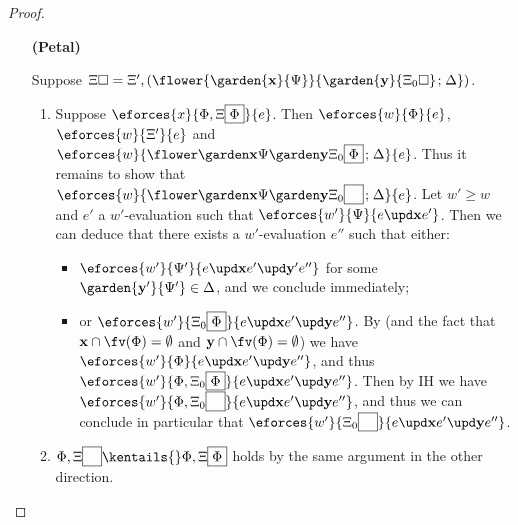 \begin{scope}
\begin{proof}
\begin{itemize}
\begin{itemize}
        \item[\textbf{(Petal)}]
          \renewcommand{\FillXi}[1]{\Xi', (\flower{\garden{\bx}{\Psi}}{\garden{\by}{#1}
          \sep \Delta})}
          \renewcommand{\rFillXi}[1]{\flower{\garden{\bx}{\Psi}}{\garden{\by}{#1}
          \sep \Delta}}

          Suppose $\Xi\hole = \FillXi{\Xi_0\hole}$.
          \begin{enumerate}
            \item Suppose $\eforces{x}{\Phi, \ffillXi{\Phi}}{e}$. Then
            $\eforces{w}{\Phi}{e}$, $\eforces{w}{\Xi'}{e}$ and
            $\eforces{w}{\rfillXi{\Phi}}{e}$. Thus it remains to show that
            $\eforces{w}{\rfillXi{\phantom{\Phi}}}{e}$. Let $w' \geq w$ and $e'$
            a $w'$-evaluation such that
            $\eforces{w'}{\Psi}{\update{e}{\bx}{e'}}$. Then we can deduce
            that there exists a $w'$-evaluation $e''$ such that either:
            \begin{itemize}
              \item
              $\eforces{w'}{\Psi'}{\update{e}{\bx}{\update{e'}{\mathbf{y'}}{e''}}}$
              for some $\garden{\mathbf{y'}}{\Psi'} \in \Delta$, and we conclude
              immediately;
              \item
              or
              $\eforces{w'}{\Xi_0\select{\Phi}}{\update{e}{\bx}{\update{e'}{\by}{e''}}}$.
              By  (and the fact that $\bx \cap
              \fv(\Phi) = \emptyset$ and $\by \cap \fv(\Phi) =
              \emptyset$) we have
              $\eforces{w'}{\Phi}{\update{e}{\bx}{\update{e'}{\by}{e''}}}$,
              and thus $\eforces{w'}{\Phi,
              \Xi_0\select{\Phi}}{\update{e}{\bx}{\update{e'}{\by}{e''}}}$.
              Then by IH we have $\eforces{w'}{\Phi,
              \Xi_0\select{\phantom{\Phi}}}{\update{e}{\bx}{\update{e'}{\by}{e''}}}$,
              and thus we can conclude in particular that $\eforces{w'}{
              \Xi_0\select{\phantom{\Phi}}}{\update{e}{\bx}{\update{e'}{\by}{e''}}}$.
            \end{itemize}

            \item $\Phi, \ffillXi{\phantom{\Phi}} \kentails{}\Phi,
            \ffillXi{\Phi}$ holds by the same argument in the other direction.
          \end{enumerate}
      \end{itemize}
  \end{itemize}
\end{proof}


\end{scope}
